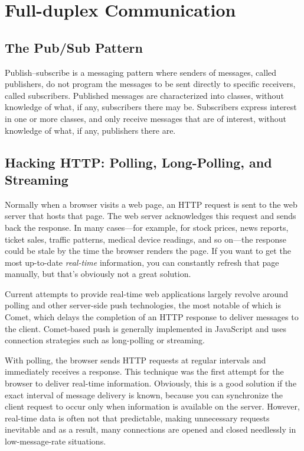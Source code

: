 \documentclass[12pt]{scrartcl}
\begin{document}
\section{Full-duplex Communication}

\subsection{The Pub/Sub Pattern}

Publish–subscribe is a messaging pattern where senders of messages, called publishers, do not program the messages to be sent directly to specific receivers, called subscribers. Published messages are characterized into classes, without knowledge of what, if any, subscribers there may be. Subscribers express interest in one or more classes, and only receive messages that are of interest, without knowledge of what, if any, publishers there are.

\subsection{Hacking HTTP: Polling, Long-Polling, and Streaming}


Normally when a browser visits a web page, an HTTP request is sent to the web server that hosts that page.  The web server acknowledges this request and sends back the response.  In many cases—for example, for stock prices, news reports, ticket sales, traffic patterns, medical device readings, and so on—the response could be stale by the time the browser renders the page. If you want to get the most up-to-date \emph{real-time} information, you can constantly refresh that page manually, but that's obviously not a great solution.

Current attempts to provide real-time web applications largely revolve around polling and other server-side push technologies, the most notable of which is Comet, which delays the completion of an HTTP response to deliver messages to the client. Comet-based push is generally implemented in JavaScript and uses connection strategies such as long-polling or streaming.

With polling, the browser sends HTTP requests at regular intervals and immediately receives a response.  This technique was the first attempt for the browser to deliver real-time information. Obviously, this is a good solution if the exact interval of message delivery is known, because you can synchronize the client request to occur only when information is available on the server. However, real-time data is often not that predictable, making unnecessary requests inevitable and as a result, many connections are opened and closed needlessly in low-message-rate situations.
\end{document}
